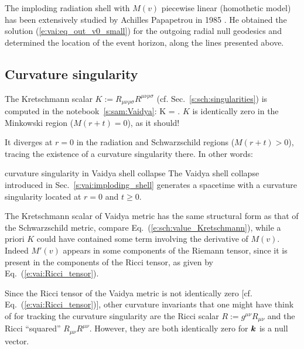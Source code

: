 \begin{hist}
The imploding radiation shell with $M(v)$ piecewise linear (homothetic model)
has been extensively
studied by Achilles Papapetrou in 1985 \cite{Papap85}.
He obtained the solution (\ref{e:vai:eq_out_v0_small}) for the outgoing radial
null geodesics and determined the location of the event horizon, along
the lines presented above.
\end{hist}

\subsection{Curvature singularity} \label{s:vai:thin:sing}

The Kretschmann scalar
$K := R_{\mu\nu\rho\sigma} R^{\mu\nu\rho\sigma}$
(cf. Sec.~\ref{s:sch:singularities})
is computed in the notebook~\ref{s:sam:Vaidya}:
\be \label{e:vai:Kretschmann}
    K =  .
\ee
$K$ is identically zero in the Minkowski region ($M(r+t) = 0$), as it should!

It diverges at $r=0$ in the radiation and Schwarzschild regions ($M(r+t) > 0$), tracing the
existence of a curvature singularity there.
In other words:
\begin{tprop}{curvature singularity in Vaidya shell collapse}{}
The Vaidya shell collapse introduced in Sec.~\ref{s:vai:imploding_shell}
generates a spacetime with a curvature singularity
located at $r=0$ and $t \geq 0$.
\end{tprop}

\begin{remark}
The Kretschmann scalar of Vaidya metric has the same structural form
as that of the Schwarzschild metric, compare Eq.~(\ref{e:sch:value_Kretschmann}),
while a priori $K$ could have
contained some term involving the derivative of $M(v)$. Indeed $M'(v)$
appears in some components of the Riemann tensor, since it is present in the
components of the Ricci tensor, as given by Eq.~(\ref{e:vai:Ricci_tensor}).
\end{remark}

\begin{remark}
Since the Ricci tensor of the Vaidya metric is not identically zero
[cf. Eq.~(\ref{e:vai:Ricci_tensor})], other curvature invariants that one might
have think of for tracking the curvature singularity are the Ricci scalar $R := g^{\mu\nu} R_{\mu\nu}$
and the Ricci ``squared'' $R_{\mu\nu} R^{\mu\nu}$. However, they are both identically zero
for $\bm{k}$ is a null vector.
\end{remark}

